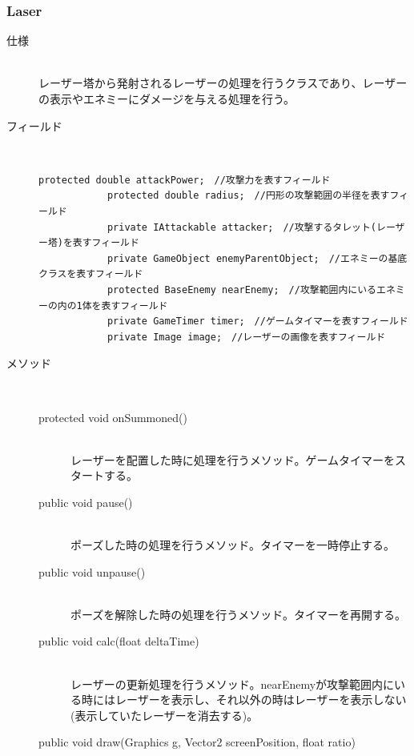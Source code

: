 \documentclass[11pt,a4j]{jarticle}
\begin{document}
\subsubsection{Laser}
\begin{description}
    \item[仕様]\mbox{}\\
          レーザー塔から発射されるレーザーの処理を行うクラスであり、レーザーの表示やエネミーにダメージを与える処理を行う。
    \item[フィールド]\mbox{}\\
          \begin{lstlisting}[caption=uectd.game.gameScene.gameMain,label=Laser, numbers=none]
            protected double attackPower;　//攻撃力を表すフィールド
            protected double radius;　//円形の攻撃範囲の半径を表すフィールド
            private IAttackable attacker;　//攻撃するタレット(レーザー塔)を表すフィールド
            private GameObject enemyParentObject;　//エネミーの基底クラスを表すフィールド
            protected BaseEnemy nearEnemy;　//攻撃範囲内にいるエネミーの内の1体を表すフィールド
            private GameTimer timer;　//ゲームタイマーを表すフィールド
            private Image image;　//レーザーの画像を表すフィールド
                \end{lstlisting}
    \item[メソッド]\mbox{}\\
          \begin{description}
              \item[protected void onSummoned()]\mbox{}\\
                    レーザーを配置した時に処理を行うメソッド。ゲームタイマーをスタートする。
              \item[public void pause()]\mbox{}\\
                    ポーズした時の処理を行うメソッド。タイマーを一時停止する。
              \item[public void unpause()]\mbox{}\\
                    ポーズを解除した時の処理を行うメソッド。タイマーを再開する。
              \item[public void calc(float deltaTime)]\mbox{}\\
                    レーザーの更新処理を行うメソッド。nearEnemyが攻撃範囲内にいる時にはレーザーを表示し、それ以外の時はレーザーを表示しない(表示していたレーザーを消去する)。
              \item[public void draw(Graphics g, Vector2 screenPosition, float ratio)] \mbox{}\\

\end{description}
\end{description}
\end{document}

